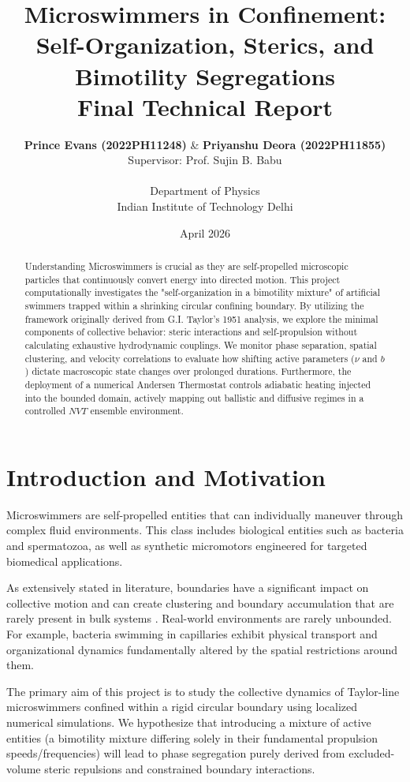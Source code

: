 \documentclass[12pt]{article}
\title{\Huge \textbf{Microswimmers in Confinement: Self-Organization, Sterics, and Bimotility Segregations} \\ \vspace{0.5cm} \Large Final Technical Report}
\author{\textbf{Prince Evans (2022PH11248)} \& \textbf{Priyanshu Deora (2022PH11855)} \\ Supervisor: Prof. Sujin B. Babu \\ \\ Department of Physics \\ Indian Institute of Technology Delhi}
\date{April 2026}
\begin{document}
\maketitle
\thispagestyle{empty}

\newpage
{}
\doublespacing

\begin{abstract}
Understanding Microswimmers is crucial as they are self-propelled microscopic particles that continuously convert energy into directed motion. This project computationally investigates the "self-organization in a bimotility mixture" of artificial swimmers trapped within a shrinking circular confining boundary. By utilizing the framework originally derived from G.I. Taylor's 1951 analysis, we explore the minimal components of collective behavior: steric interactions and self-propulsion without calculating exhaustive hydrodynamic couplings. We monitor phase separation, spatial clustering, and velocity correlations to evaluate how shifting active parameters ($\nu$ and $b$) dictate macroscopic state changes over prolonged durations. Furthermore, the deployment of a numerical Andersen Thermostat controls adiabatic heating injected into the bounded domain, actively mapping out ballistic and diffusive regimes in a controlled $NVT$ ensemble environment.
\end{abstract}

\vspace{1cm}

\tableofcontents

\newpage

\section{Introduction and Motivation}
Microswimmers are self-propelled entities that can individually maneuver through complex ﬂuid environments. This class includes biological entities such as bacteria and spermatozoa, as well as synthetic micromotors engineered for targeted biomedical applications.

As extensively stated in literature, boundaries have a significant impact on collective motion and can create clustering and boundary accumulation that are rarely present in bulk systems \cite{Agrawal2018}. Real-world environments are rarely unbounded. For example, bacteria swimming in capillaries exhibit physical transport and organizational dynamics fundamentally altered by the spatial restrictions around them.

The primary aim of this project is to study the collective dynamics of Taylor-line microswimmers conﬁned within a rigid circular boundary using localized numerical simulations. We hypothesize that introducing a mixture of active entities (a bimotility mixture differing solely in their fundamental propulsion speeds/frequencies) will lead to phase segregation purely derived from excluded-volume steric repulsions and constrained boundary interactions.
\end{document}
